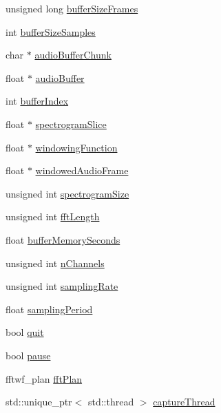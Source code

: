 \begin{DoxyCompactItemize}
\item 
unsigned long \hyperlink{classAudioInput_adb734d274b7ce2967b74e2280ff6d487}{buffer\+Size\+Frames}
\item 
int \hyperlink{classAudioInput_a4e213a9a22a62dccc3a54369101559c7}{buffer\+Size\+Samples}
\item 
char $\ast$ \hyperlink{classAudioInput_ab1f2b0fc5ee061ab92c045d2325c8ab7}{audio\+Buffer\+Chunk}
\item 
float $\ast$ \hyperlink{classAudioInput_a797943485896a381ea80947c8b6a8488}{audio\+Buffer}
\item 
int \hyperlink{classAudioInput_a3c9888a90ca8bc6b42257f3f11ee9a6e}{buffer\+Index}
\item 
float $\ast$ \hyperlink{classAudioInput_aa277accc3be5054fe8439ac7086deaf5}{spectrogram\+Slice}
\item 
float $\ast$ \hyperlink{classAudioInput_a72417120c208d81359f5b1205fc06664}{windowing\+Function}
\item 
float $\ast$ \hyperlink{classAudioInput_ae5a196a9ba111b7aa1ef64db6f092432}{windowed\+Audio\+Frame}
\item 
unsigned int \hyperlink{classAudioInput_a1d4982a84d2e2e3d8a6b0f0fcdd4820e}{spectrogram\+Size}
\item 
unsigned int \hyperlink{classAudioInput_a5b31598e9106da62d86d11d69a9dbd20}{fft\+Length}
\item 
float \hyperlink{classAudioInput_aea3145ccca0f7cebf36a78278ca44031}{buffer\+Memory\+Seconds}
\item 
unsigned int \hyperlink{classAudioInput_a364801e7fa59b6c8ed881262b2085d42}{n\+Channels}
\item 
unsigned int \hyperlink{classAudioInput_acfe371c4f5790bd67d282bc83225728e}{sampling\+Rate}
\item 
float \hyperlink{classAudioInput_a8b6ea4cd6b88e5cd9d051b298efbb65e}{sampling\+Period}
\item 
bool \hyperlink{classAudioInput_aceef1c12e4f78624ed695371adf495df}{quit}
\item 
bool \hyperlink{classAudioInput_a3ff41f73529f77872f6ab585d7cf706a}{pause}
\item 
fftwf\+\_\+plan \hyperlink{classAudioInput_a9797094e75625173beae7e89497248b2}{fft\+Plan}
\item 
std\+::unique\+\_\+ptr$<$ std\+::thread $>$ \hyperlink{classAudioInput_ab113eec222bed512656f17a970082c62}{capture\+Thread}
\end{DoxyCompactItemize}


